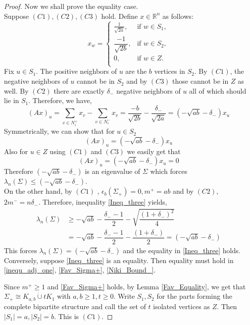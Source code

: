 \documentclass[12pt]{article}
\theoremstyle{plain}
\numberwithin{equation}{section}
\begin{document}
\begin{proof}
		Now we shall prove the equality case. \\
		Suppose $(C1), (C2), (C3)$ hold. Define $x \in \mathbb{R}^n$ as follows:\\
		$$
		x_w =
		\begin{cases}
			\frac{1}{\sqrt{2a}}, & \text{if } w \in S_1,\\
			\dfrac{-1}{\sqrt{2b}}, & \text{if } w \in S_2,\\
			0, & \text{if } w\in Z. \\
		\end{cases}
		$$
		Fix $u \in S_1$. The positive neighbors of $u$ are the $b$ vertices in $S_2$. By $(C1)$, the negative neighbors of $u$ cannot be in $S_2$ and by $(C3)$ those cannot be in $Z$ as well. By $(C2)$ there are exactly $\delta_-$ negative neighbors of $u$ all of which should lie in $S_1$. Therefore, we have,
		\begin{equation*}
			(Ax)_u= \sum \limits_{v \in N^+_i}x_v -  \sum \limits_{v \in N^-_i}x_v=\dfrac{-b}{\sqrt{2b}}-\dfrac{\delta_-}{\sqrt{2a}}=(-\sqrt{ab}-\delta_-)x_u
		\end{equation*}
		Symmetrically, we can show that for $u \in S_2$
		\begin{equation*}
			(Ax)_u=(-\sqrt{ab}-\delta_-)x_u
		\end{equation*}
		Also for $u \in Z$ using $(C1)$ and $(C3)$ we easily get that
		\begin{equation*}
			(Ax)_u=(-\sqrt{ab}-\delta_-)x_u=0
		\end{equation*}
		Therefore $(-\sqrt{ab}-\delta_-)$ is an eigenvalue of $\Sigma$ which forces $\lambda_n(\Sigma) \leq (-\sqrt{ab}-\delta_-)$.\\
		On the other hand, by $(C1)$
		, $\epsilon_b(\Sigma_+)=0, m^+=ab$ and by $(C2)$, $2m^-=n\delta_-$. Therefore, inequality \eqref{Ineq_three} yields,
		\begin{align*}
			\lambda_n(\Sigma) &\geq -\sqrt{ab} -\dfrac{\delta_--1}{2}-\sqrt{\dfrac{(1+\delta_-)^2}{4}}\\
			&= -\sqrt{ab} -\dfrac{\delta_--1}{2}-\dfrac{(1+\delta_-)}{2}=(-\sqrt{ab}-\delta_-)
		\end{align*}
		This forces $\lambda_n(\Sigma) = (-\sqrt{ab}-\delta_-)$ and the equality in \eqref{Ineq_three} holds.\\
		Conversely, suppose \eqref{Ineq_three} is an equality. Then equality must hold in \eqref{inequ_adj_one}, \eqref{Fav_Sigma+}, \eqref{Niki_Bound_}.
		
		Since $m^+ \geq 1$ and \eqref{Fav_Sigma+} holds, by Lemma \ref{Fav_Equality}, we get that $\Sigma_+ \cong K_{a,b} \dot{\cup} tK_1$ with $a,b \geq 1, t \geq 0$. Write $S_1, S_2$ for the parts forming the complete bipartite structure and call the set of $t$ isolated vertices as $Z$. Then $\vert S_1 \vert =a, \vert S_2 \vert =b$. This is $(C1)$. 
		

\end{proof}
\end{document}
